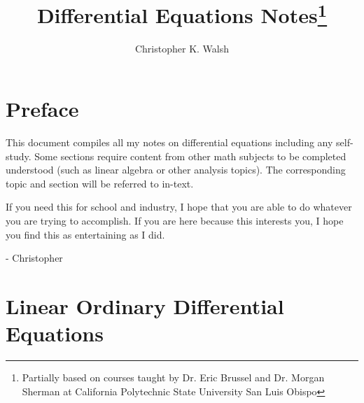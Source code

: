 \documentclass[12pt,openany]{book}
\title{Differential Equations Notes\thanks{Partially based on courses taught by Dr. Eric Brussel and Dr. Morgan Sherman at California Polytechnic State University San Luis Obispo}}
\author{Christopher K. Walsh}
\date{ }
\theoremstyle{mydefinitionstyle}
\theoremstyle{myexamplestyle}
\theoremstyle{remark}
\begin{document}
\maketitle
\tableofcontents

\newpage
\chapter*{Preface}
This document compiles all my notes on differential equations including any self-study.
Some sections require content from other math subjects to be completed understood (such as linear algebra or other analysis topics).
The corresponding topic and section will be referred to in-text.

If you need this for school and industry, I hope that you are able to do whatever you are trying to accomplish.
If you are here because this interests you, I hope you find this as entertaining as I did.

- Christopher

\chapter{Linear Ordinary Differential Equations}

\end{document}
